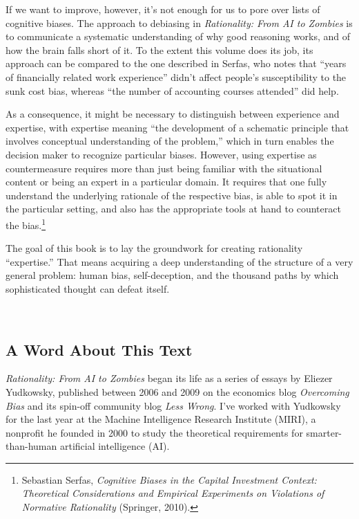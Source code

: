\documentclass[letterpaper]{book}
\newcommand{\comment}[1]{
}
\begin{document}
{
 If we want to improve, however, it's not enough
for us to pore over lists of cognitive biases. The approach to
debiasing in \textit{Rationality: From AI to Zombies} is to communicate
a systematic understanding of why good reasoning works, and of how the
brain falls short of it. To the extent this volume does its job, its
approach can be compared to the one described in Serfas, who notes that
``years of financially related work
experience'' didn't affect
people's susceptibility to the sunk cost bias, whereas
``the number of accounting courses
attended'' did help.}

{
 As a consequence, it might be necessary to distinguish between
experience and expertise, with expertise meaning ``the
development of a schematic principle that involves conceptual
understanding of the problem,'' which in turn enables
the decision maker to recognize particular biases. However, using
expertise as countermeasure requires more than just being familiar with
the situational content or being an expert in a particular domain. It
requires that one fully understand the underlying rationale of the
respective bias, is able to spot it in the particular setting, and also
has the appropriate tools at hand to counteract the
bias.\footnote{Sebastian Serfas, \textit{Cognitive Biases in the Capital
Investment Context: Theoretical Considerations and Empirical
Experiments on Violations of Normative Rationality} (Springer, 2010).\comment{19}}}

{
 The goal of this book is to lay the groundwork for creating
rationality ``expertise.'' That
means acquiring a deep understanding of the structure of a very general
problem: human bias, self-deception, and the thousand paths by which
sophisticated thought can defeat itself.}

{
 ~}

\subsection{A Word About This Text}

{
 \textit{Rationality: From AI to Zombies} began its life as a
series of essays by Eliezer Yudkowsky, published between 2006 and 2009
on the economics blog \textit{Overcoming Bias} and its spin-off
community blog \textit{Less Wrong}. I've worked with
Yudkowsky for the last year at the Machine Intelligence Research
Institute (MIRI), a nonprofit he founded in 2000 to study the
theoretical requirements for smarter-than-human artificial intelligence
(AI).}
\end{document}
